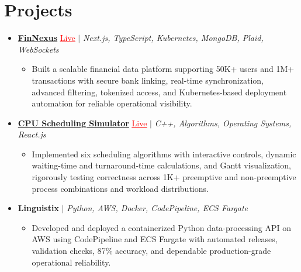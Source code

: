 \documentclass[letterpaper,10pt]{article}
\newcommand{\itemTail}{\vspace{-5pt}}
\newcommand{\projGap}{\vspace{3pt}}
\newcommand{\resumeItem}[1]{\item\small{{#1 \itemTail}}}
\newcommand{\resumeProjectHeading}[1]{\item \small #1 \vspace{-2pt}}
\newcommand{\resumeProjectLink}[2]{\href{#1}{\textcolor{red}{\underline{#2}}}}
\newcommand{\resumeSubHeadingListStart}{\begin{itemize}[leftmargin=0.0in, label={}]}
\newcommand{\resumeSubHeadingListEnd}{\end{itemize}}
\newcommand{\resumeProjItemListStart}{\begin{itemize}[leftmargin=0.15in,label=\textbullet,itemsep=3pt,topsep=0pt,parsep=0pt,partopsep=0pt]}
\newcommand{\resumeProjItemListEnd}{\end{itemize}\vspace{-4pt}}
\begin{document}
\section{Projects}
\resumeSubHeadingListStart
\vspace{-2pt}
\resumeProjectHeading{\href{https://fin-nexus.vercel.app/}{\textbf{FinNexus}} \resumeProjectLink{https://fin-nexus.vercel.app/}{Live} $|$ \emph{Next.js, TypeScript, Kubernetes, MongoDB, Plaid, WebSockets}}
\resumeProjItemListStart
\resumeItem{Built a scalable financial data platform supporting 50K+ users and 1M+ transactions with secure bank linking, real-time synchronization, advanced filtering, tokenized access, and Kubernetes-based deployment automation for reliable operational visibility.}
\resumeProjItemListEnd
\projGap
\resumeProjectHeading{\href{https://cpu-scheduler-amber.vercel.app/}{\textbf{CPU Scheduling Simulator}} \resumeProjectLink{https://cpu-scheduler-amber.vercel.app/}{Live} $|$ \emph{C++, Algorithms, Operating Systems, React.js}}
\resumeProjItemListStart
\resumeItem{Implemented six scheduling algorithms with interactive controls, dynamic waiting-time and turnaround-time calculations, and Gantt visualization, rigorously testing correctness across 1K+ preemptive and non-preemptive process combinations and workload distributions.}
\resumeProjItemListEnd
\projGap
\resumeProjectHeading{\textbf{Linguistix} $|$ \emph{Python, AWS, Docker, CodePipeline, ECS Fargate}}
\resumeProjItemListStart
\resumeItem{Developed and deployed a containerized Python data-processing API on AWS using CodePipeline and ECS Fargate with automated releases, validation checks, 87\% accuracy, and dependable production-grade operational reliability.}
\resumeProjItemListEnd
\resumeSubHeadingListEnd
\end{document}
